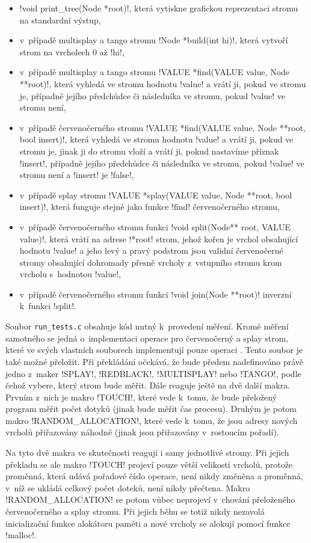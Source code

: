 \begin{itemize}
\item !void print_tree(Node *root)!, která vytiskne grafickou reprezentaci stromu na standardní výstup,
\item v~případě multisplay a tango stromu !Node *build(int hi)!, která vytvoří strom na vrcholech 0 až !hi!,
\item v~případě multisplay a tango stromu !VALUE *find(VALUE value, Node **root)!, která vyhledá ve stromu hodnotu !value! a vrátí ji, pokud ve stromu je, případně jejího předchůdce či následníka ve stromu, pokud !value! ve stromu není,
\item v~případě červenočerného stromu !VALUE *find(VALUE value, Node **root, bool insert)!, která vyhledá ve stromu hodnotu !value! a vrátí ji, pokud ve stromu je, jinak ji do stromu vloží a vrátí ji, pokud nastavíme příznak !insert!, případně jejího předchůdce či následníka ve stromu, pokud !value! ve stromu není a !insert! je !false!,
\item v~případě splay stromu !VALUE *splay(VALUE value, Node **root, bool insert)!, která funguje stejně jako funkce !find! červenočerného stromu,
\item v~případě červenočerného stromu funkci !void split(Node** root, VALUE value)!, která vrátí na adrese !*root! strom, jehož kořen je vrchol obsahující hodnotu !value! a jeho levý a pravý podstrom jsou validní červenočerné stromy obsahující dohromady přesně vrcholy z~vstupního stromu krom vrcholu s~hodnotou !value!,
\item v~případě červenočerného stromu funkci !void join(Node **root)! inverzní k~funkci !split!.
\end{itemize}

Soubor {\tt run_tests.c} obsahuje kód nutný k~provedení měření. Kromě měření
samotného se jedná o~implementaci operace  pro červenočerný a splay
strom, které ve svých vlastních souborech implementují pouze operaci
. Tento soubor je také možné přeložit. Při překládání očekává, že
bude předem nadefinováno právě jedno z~maker !SPLAY!, !REDBLACK!, !MULTISPLAY!
nebo !TANGO!, podle čehož vybere, který strom bude měřit. Dále reaguje ještě na
dvě další makra. Prvním z~nich je makro !TOUCH!, které vede k~tomu, že bude
přeložený program měřit počet dotyků (jinak bude měřit čas procesu). Druhým je
potom makro !RANDOM_ALLOCATION!, které vede k~tomu, že jsou adresy nových
vrcholů přiřazovány náhodně (jinak jsou přiřazovány v~rostoucím pořadí).

Na tyto dvě makra ve skutečnosti reagují i samy jednotlivé stromy. Při jejich
překladu se ale makro !TOUCH! projeví pouze větší velikostí vrcholů, protože
proměnná, která udává pořadové číslo operace, není nikdy změněna a proměnná,
v~níž se ukládá celkový počet doteků, není nikdy přečtena. Makro
!RANDOM_ALLOCATION! se potom vůbec neprojeví v~chování přeloženého
červenočerného a splay stromu. Při jejich běhu se totiž nikdy nezavolá
inicializační funkce alokátoru paměti a nové vrcholy se alokují pomocí funkce
!malloc!.

